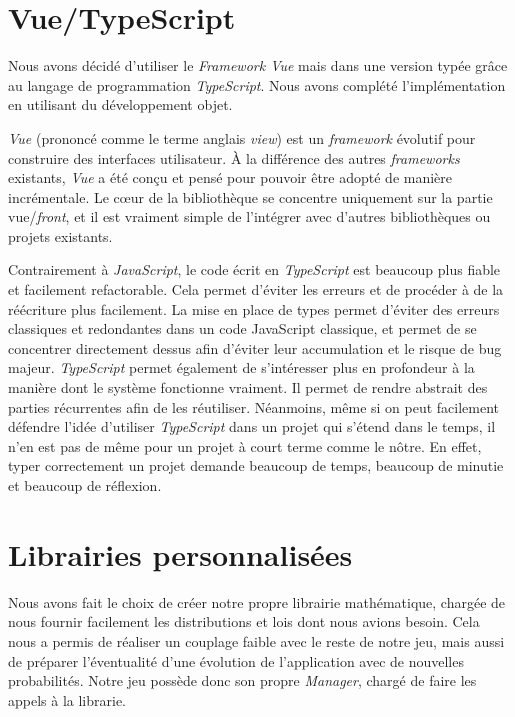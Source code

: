 \documentclass[a4paper, 12pt]{report}
\begin{document}
\section{Vue/TypeScript}

\tabto{1cm}Nous avons décidé d'utiliser le \textit{Framework Vue} mais dans une version typée grâce au
langage de programmation \textit{TypeScript}. Nous avons complété l'implémentation en utilisant du développement objet.

\vspace{0.5cm}

\tabto{1cm}\textit{Vue} (prononcé comme le terme anglais \textit{view}) est un \textit{framework} évolutif pour construire des
interfaces utilisateur. À la différence des autres \textit{frameworks} existants, \textit{Vue} a été conçu et pensé
pour pouvoir être adopté de manière incrémentale. Le cœur de la bibliothèque se concentre uniquement
sur la partie vue/\textit{front}, et il est vraiment simple de l’intégrer avec d’autres bibliothèques ou projets
existants.

\vspace{0.5cm}

\tabto{1cm}Contrairement à \textit{JavaScript}, le code écrit en \textit{TypeScript} est beaucoup plus fiable et facilement refactorable. 
Cela permet d'éviter les erreurs et de procéder à de la réécriture plus facilement.
La mise en place de types permet d'éviter des erreurs classiques et redondantes dans un code JavaScript classique,
et permet de se concentrer directement dessus afin d'éviter leur accumulation et le risque de bug majeur.
\tabto{1cm} \textit{TypeScript} permet également de s'intéresser plus en profondeur à la manière dont le système fonctionne vraiment.
Il permet de rendre abstrait des parties récurrentes afin de les réutiliser.
\tabto{1cm} Néanmoins, même si on peut facilement défendre l'idée d'utiliser \textit{TypeScript} dans un projet qui s'étend dans
le temps, il n'en est pas de même pour un projet à court terme comme le nôtre. En effet, typer correctement un projet
demande beaucoup de temps, beaucoup de minutie et beaucoup de réflexion.

\section{Librairies personnalisées}

\tabto{1cm}Nous avons fait le choix de créer notre propre librairie mathématique, chargée de nous fournir facilement les distributions et lois
dont nous avions besoin. Cela nous a permis de réaliser un couplage faible avec le reste de notre jeu, mais aussi de préparer
l'éventualité d'une évolution de l'application avec de nouvelles probabilités. Notre jeu possède donc son propre \textit{Manager}, chargé 
de faire les appels à la librarie.
\end{document}
